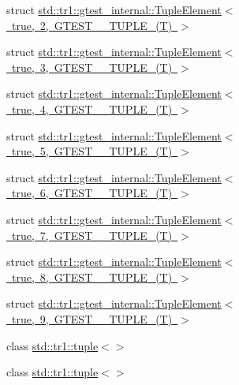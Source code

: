 \begin{DoxyCompactItemize}
\item 
struct \mbox{\hyperlink{structstd_1_1tr1_1_1gtest__internal_1_1TupleElement_3_01true_00_012_00_01GTEST__10__TUPLE___07T_08_01_4}{std\+::tr1\+::gtest\+\_\+internal\+::\+Tuple\+Element$<$ true, 2, G\+T\+E\+S\+T\+\_\+\_\+\+T\+U\+P\+L\+E\+\_\+(\+T) $>$}}
\item 
struct \mbox{\hyperlink{structstd_1_1tr1_1_1gtest__internal_1_1TupleElement_3_01true_00_013_00_01GTEST__10__TUPLE___07T_08_01_4}{std\+::tr1\+::gtest\+\_\+internal\+::\+Tuple\+Element$<$ true, 3, G\+T\+E\+S\+T\+\_\+\_\+\+T\+U\+P\+L\+E\+\_\+(\+T) $>$}}
\item 
struct \mbox{\hyperlink{structstd_1_1tr1_1_1gtest__internal_1_1TupleElement_3_01true_00_014_00_01GTEST__10__TUPLE___07T_08_01_4}{std\+::tr1\+::gtest\+\_\+internal\+::\+Tuple\+Element$<$ true, 4, G\+T\+E\+S\+T\+\_\+\_\+\+T\+U\+P\+L\+E\+\_\+(\+T) $>$}}
\item 
struct \mbox{\hyperlink{structstd_1_1tr1_1_1gtest__internal_1_1TupleElement_3_01true_00_015_00_01GTEST__10__TUPLE___07T_08_01_4}{std\+::tr1\+::gtest\+\_\+internal\+::\+Tuple\+Element$<$ true, 5, G\+T\+E\+S\+T\+\_\+\_\+\+T\+U\+P\+L\+E\+\_\+(\+T) $>$}}
\item 
struct \mbox{\hyperlink{structstd_1_1tr1_1_1gtest__internal_1_1TupleElement_3_01true_00_016_00_01GTEST__10__TUPLE___07T_08_01_4}{std\+::tr1\+::gtest\+\_\+internal\+::\+Tuple\+Element$<$ true, 6, G\+T\+E\+S\+T\+\_\+\_\+\+T\+U\+P\+L\+E\+\_\+(\+T) $>$}}
\item 
struct \mbox{\hyperlink{structstd_1_1tr1_1_1gtest__internal_1_1TupleElement_3_01true_00_017_00_01GTEST__10__TUPLE___07T_08_01_4}{std\+::tr1\+::gtest\+\_\+internal\+::\+Tuple\+Element$<$ true, 7, G\+T\+E\+S\+T\+\_\+\_\+\+T\+U\+P\+L\+E\+\_\+(\+T) $>$}}
\item 
struct \mbox{\hyperlink{structstd_1_1tr1_1_1gtest__internal_1_1TupleElement_3_01true_00_018_00_01GTEST__10__TUPLE___07T_08_01_4}{std\+::tr1\+::gtest\+\_\+internal\+::\+Tuple\+Element$<$ true, 8, G\+T\+E\+S\+T\+\_\+\_\+\+T\+U\+P\+L\+E\+\_\+(\+T) $>$}}
\item 
struct \mbox{\hyperlink{structstd_1_1tr1_1_1gtest__internal_1_1TupleElement_3_01true_00_019_00_01GTEST__10__TUPLE___07T_08_01_4}{std\+::tr1\+::gtest\+\_\+internal\+::\+Tuple\+Element$<$ true, 9, G\+T\+E\+S\+T\+\_\+\_\+\+T\+U\+P\+L\+E\+\_\+(\+T) $>$}}
\item 
class \mbox{\hyperlink{classstd_1_1tr1_1_1tuple_3_4}{std\+::tr1\+::tuple$<$$>$}}
\item 
class \mbox{\hyperlink{classstd_1_1tr1_1_1tuple}{std\+::tr1\+::tuple$<$$>$}}

\end{DoxyCompactItemize}
